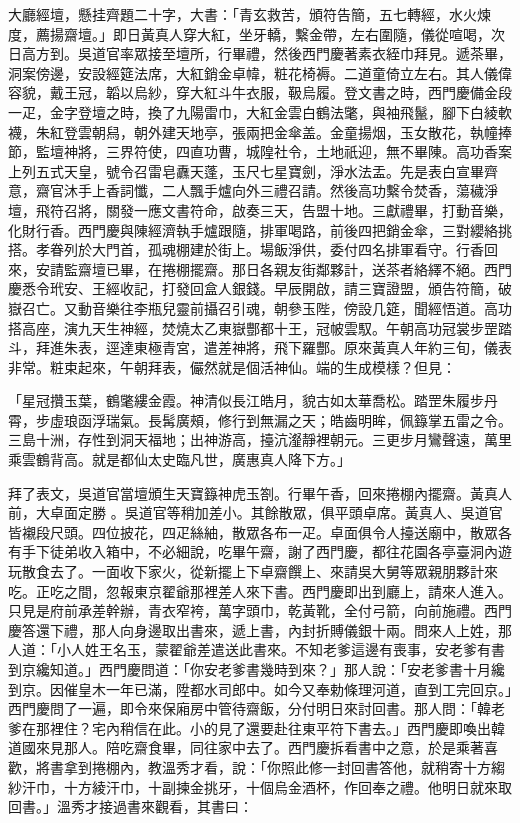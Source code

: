 大廳經壇，懸挂齊題二十字，大書：「青玄救苦，頒符告簡，五七轉經，水火煉度，薦揚齋壇。」即日黃真人穿大紅，坐牙轎，繫金帶，左右圍隨，儀從喧喝，次日高方到。吳道官率眾接至壇所，行畢禮，然後西門慶著素衣絰巾拜見。遞茶畢，洞案傍邊，安設經筵法席，大紅銷金卓幃，粧花椅褥。二道童倚立左右。其人儀偉容貌，戴王冠，韜以烏紗，穿大紅斗牛衣服，靸烏履。登文書之時，西門慶備金段一疋，金字登壇之時，換了九陽雷巾，大紅金雲白鶴法氅，與袖飛鬣，腳下白綾軟襪，朱紅登雲朝舄，朝外建天地亭，張兩把金傘盖。金童揚烟，玉女散花，執幢捧節，監壇神將，三界符使，四直功曹，城隍社令，土地祇迎，無不畢陳。高功香案上列五式天皇，號令召雷皂纛天蓬，玉尺七星寶劍，淨水法盂。先是表白宣畢齊意，齋官沐手上香詞懺，二人飄手爐向外三禮召請。然後高功繫令焚香，蕩穢淨壇，飛符召將，關發一應文書符命，啟奏三天，告盟十地。三獻禮畢，打動音樂，化財行香。西門慶與陳經濟執手爐跟隨，排軍喝路，前後四把銷金傘，三對纓絡挑搭。孝眷列於大門首，孤魂棚建於街上。場飯淨供，委付四名排軍看守。行香回來，安請監齋壇已畢，在捲棚擺齋。那日各親友街鄰夥計，送茶者絡繹不絕。西門慶悉令玳安、王經收記，打發回盒人銀錢。早辰開啟，請三寶證盟，頒告符簡，破嶽召亡。又動音樂往李瓶兒靈前攝召引魂，朝參玉陛，傍設几筵，聞經悟道。高功搭高座，演九天生神經，焚燒太乙東嶽酆都十王，冠帔雲馭。午朝高功冠裳步罡踏斗，拜進朱表，逕達東極青宮，遣差神將，飛下羅酆。原來黃真人年約三旬，儀表非常。粧束起來，午朝拜表，儼然就是個活神仙。端的生成模樣？但見：

「星冠攢玉葉，鶴氅縷金霞。神清似長江皓月，貌古如太華喬松。踏罡朱履步丹霄，步虛琅函浮瑞氣。長髯廣頰，修行到無漏之天；皓齒明眸，佩籙掌五雷之令。三島十洲，存性到洞天福地；出神游高，擡沆瀣靜裡朝元。三更步月鸞聲遠，萬里乘雲鶴背高。就是都仙太史臨凡世，廣惠真人降下方。」

拜了表文，吳道官當壇頒生天寶籙神虎玉劄。行畢午香，回來捲棚內擺齋。黃真人前，大卓面定勝 。吳道官等稍加差小。其餘散眾，俱平頭卓席。黃真人、吳道官皆襯段尺頭。四位披花，四疋絲紬，散眾各布一疋。卓面俱令人擡送廟中，散眾各有手下徒弟收入箱中，不必細說，吃畢午齋，謝了西門慶，都往花園各亭臺洞內遊玩散食去了。一面收下家火，從新擺上下卓齋饌上、來請吳大舅等眾親朋夥計來吃。正吃之間，忽報東京翟爺那裡差人來下書。西門慶即出到廳上，請來人進入。只見是府前承差幹辦，青衣窄袴，萬字頭巾，乾黃靴，全付弓箭，向前施禮。西門慶答還下禮，那人向身邊取出書來，遞上書，內封折賻儀銀十兩。問來人上姓，那人道：「小人姓王名玉，蒙翟爺差遣送此書來。不知老爹這邊有喪事，安老爹有書到京纔知道。」西門慶問道：「你安老爹書幾時到來？」那人說：「安老爹書十月纔到京。因催皇木一年已滿，陞都水司郎中。如今又奉勅條理河道，直到工完回京。」西門慶問了一遍，即令來保廂房中管待齋飯，分付明日來討回書。那人問：「韓老爹在那裡住？宅內稍信在此。小的見了還要赴往東平符下書去。」西門慶即喚出韓道國來見那人。陪吃齋食畢，同往家中去了。西門慶拆看書中之意，於是乘著喜歡，將書拿到捲棚內，教溫秀才看，說：「你照此修一封回書答他，就稍寄十方縐紗汗巾，十方綾汗巾，十副揀金挑牙，十個烏金酒杯，作回奉之禮。他明日就來取回書。」溫秀才接過書來觀看，其書曰：

